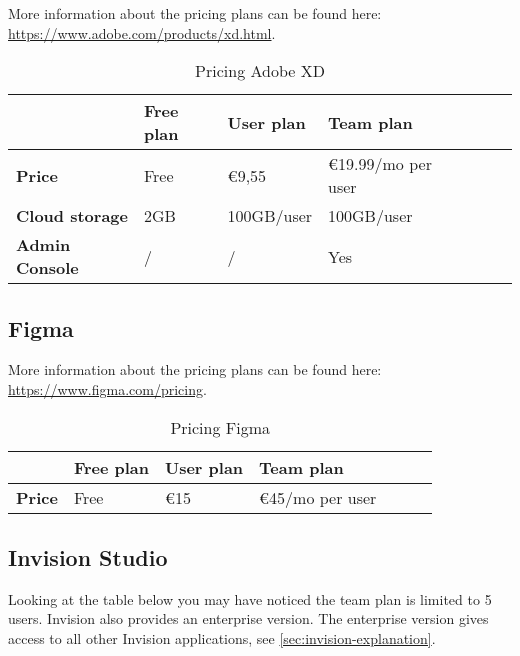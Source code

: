 More information about the pricing plans can be found here: \url{https://www.adobe.com/products/xd.html}.

\begin{table}[H]
\centering
\begin{tabular}{ | l | l | l | l | l | l | l | }
  \toprule
                                & \textbf{Free plan}     & \textbf{User plan} & \textbf{Team plan}          \\
  \midrule
  \textbf{Price}                & Free                      & €9,55             & €19.99/mo per user        \\
  \textbf{Cloud storage}        & 2GB                       & 100GB/user        & 100GB/user                \\
  \textbf{Admin Console}        & /                         &  /                & Yes                       \\
  \bottomrule
\end{tabular}
\captionsetup{justification=centering}
\caption{Pricing Adobe XD \label{tab:pricing-adobe-xd}}
\end{table}

\subsection{Figma}
More information about the pricing plans can be found here: \url{https://www.figma.com/pricing}.
\begin{table}[H]
\centering
\begin{tabular}{ | l | l | l | l | l | l | l | }
  \toprule
                                & \textbf{Free plan}     & \textbf{User plan}    & \textbf{Team plan}    \\
  \midrule
  \textbf{Price}                & Free                      & €15                   & €45/mo per user       \\
  \bottomrule
\end{tabular}
\captionsetup{justification=centering}
\caption{Pricing Figma \label{tab:pricing-figma}}
\end{table}

\subsection{Invision Studio}
Looking at the table below you may have noticed the team plan is limited to 5 users. Invision also provides an enterprise version. The enterprise version gives access to all other Invision applications, see \autoref{sec:invision-explanation}.

